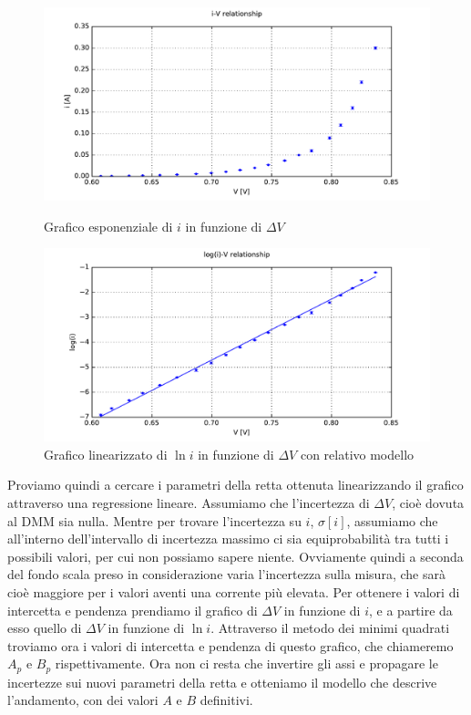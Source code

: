 \begin{figure}
    \centering
    \begin{minipage}{0.5\textwidth}
        \centering
        \includegraphics[width=\textwidth]{fig1D.pdf} 
        \caption{Grafico esponenziale di $i$ in funzione di $\Delta V$}
        \label{fig:gDe}
    \end{minipage}\hfill
    \begin{minipage}{0.5\textwidth}
        \centering
        \includegraphics[width=\textwidth]{fig2D.pdf} 
        \caption{Grafico linearizzato di $\ln{i}$ in funzione di $\Delta V$ con relativo modello}
        \label{fig:gDl}
    \end{minipage}
    
\end{figure}
    
Proviamo quindi a cercare i parametri della retta ottenuta linearizzando il grafico attraverso una regressione lineare. Assumiamo che l'incertezza di $\Delta V$, cioè dovuta al DMM sia nulla. Mentre per trovare l'incertezza su $i$, $\sigma[i]$, assumiamo che all'interno dell'intervallo di incertezza massimo ci sia equiprobabilità tra tutti i possibili valori, per cui non possiamo sapere niente. Ovviamente quindi a seconda del fondo scala preso in considerazione varia l'incertezza sulla misura, che sarà cioè maggiore per i valori aventi una corrente più elevata. Per ottenere i valori di intercetta e pendenza prendiamo il grafico di $\Delta V$ in funzione di $i$, e a partire da esso quello di $\Delta V$ in funzione di $\ln{i}$. Attraverso il metodo dei minimi quadrati troviamo ora i valori di intercetta e pendenza di questo grafico, che chiameremo $A_p$ e $B_p$ rispettivamente. Ora non ci resta che invertire gli assi e propagare le incertezze sui nuovi parametri della retta e otteniamo il modello che descrive l'andamento, con dei valori $A$ e $B$ definitivi. \\

